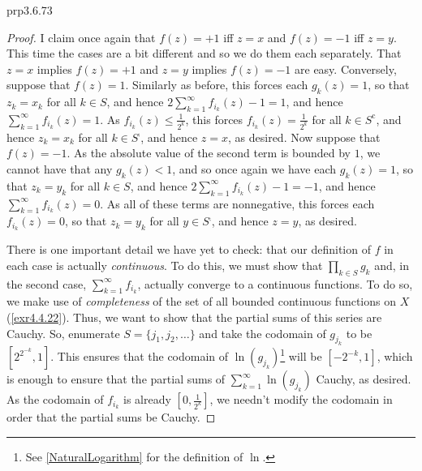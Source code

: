 \begin{prp}{}{prp3.6.73}
\begin{proof}
I claim once again that $f(z)=+1$ iff $z=x$ and $f(z)=-1$ iff $z=y$.  This time the cases are a bit different and so we do them each separately.  That $z=x$ implies $f(z)=+1$ and $z=y$ implies $f(z)=-1$ are easy.  Conversely, suppose that $f(z)=1$.  Similarly as before, this forces each $g_k(z)=1$, so that $z_k=x_k$ for all $k\in S$, and hence $2\sum _{k=1}^{\infty}f_{i_k}(z)-1=1$, and hence $\sum _{k=1}^{\infty}f_{i_k}(z)=1$.  As $f_{i_k}(z)\leq \frac{1}{2^k}$, this forces $f_{i_k}(z)=\frac{1}{2^k}$ for all $k\in S^{\mathrm{c}}$, and hence $z_k=x_k$ for all $k\in S^{\comp}$, and hence $z=x$, as desired.  Now suppose that $f(z)=-1$.  As the absolute value of the second term is bounded by $1$, we cannot have that any $g_k(z)<1$, and so once again we have each $g_k(z)=1$, so that $z_k=y_k$ for all $k\in S$, and hence $2\sum _{k=1}^{\infty}f_{i_k}(z)-1=-1$, and hence $\sum _{k=1}^{\infty}f_{i_k}(z)=0$.  As all of these terms are nonnegative, this forces each $f_{i_k}(z)=0$, so that $z_k=y_k$ for all $y\in S^{\comp}$, and hence $z=y$, as desired.

There is one important detail we have yet to check:  that our definition of $f$ in each case is actually \emph{continuous}.  To do this, we must show that $\prod _{k\in S}g_k$ and, in the second case, $\sum _{k=1}^{\infty}f_{i_k}$, actually converge to a continuous functions.  To do so, we make use of \emph{completeness} of the set of all bounded continuous functions on $X$ (\cref{exr4.4.22}).  Thus, we want to show that the partial sums of this series are Cauchy.  So, enumerate $S=\{ j_1,j_2,\ldots \}$ and take the codomain of $g_{j_k}$ to be $[2^{2^{-k}},1]$.  This ensures that the codomain of $\ln (g_{j_k})$\footnote{See \cref{NaturalLogarithm} for the definition of $\ln$.} will be $[-2^{-k},1]$, which is enough to ensure that the partial sums of $\sum _{k=1}^{\infty}\ln (g_{j_k})$ Cauchy, as desired.  As the codomain of $f_{i_k}$ is already $[0,\frac{1}{2^k}]$, we needn't modify the codomain in order that the partial sums be Cauchy.
\end{proof}
\end{prp}

